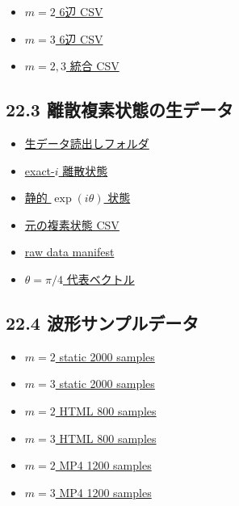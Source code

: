 \documentclass[
  a4paper,
]{ltjsarticle}
\providecommand{\tightlist}{%
  \setlength{\itemsep}{0pt}\setlength{\parskip}{0pt}}
\begin{document}
\begin{itemize}
\tightlist
\item
  \href{edges_m2.csv}{\(m=2\) 6辺 CSV}
\item
  \href{edges_m3.csv}{\(m=3\) 6辺 CSV}
\item
  \href{all_edges_m2_m3.csv}{\(m=2,3\) 統合 CSV}
\end{itemize}

\subsection{22.3
離散複素状態の生データ}\label{ux96e2ux6563ux8907ux7d20ux72b6ux614bux306eux751fux30c7ux30fcux30bf}

\begin{itemize}
\tightlist
\item
  \href{再現性検証_生データ読出し_20260915/}{生データ読出しフォルダ}
\item
  \href{再現性検証_生データ読出し_20260915/raw_data/complex_states_animation_exact_i.csv}{exact-\(i\)
  離散状態}
\item
  \href{再現性検証_生データ読出し_20260915/raw_data/complex_states_static_exp.csv}{静的
  \(\exp(i\theta)\) 状態}
\item
  \href{再現性検証_生データ読出し_20260915/raw_data/complex_states.csv}{元の複素状態
  CSV}
\item
  \href{再現性検証_生データ読出し_20260915/raw_data/RAW_DATA_MANIFEST.csv}{raw
  data manifest}
\item
  \href{再現性検証_生データ読出し_20260915/raw_data/representative_vectors_theta_pi4.csv}{\(\theta=\pi/4\)
  代表ベクトル}
\end{itemize}

\subsection{22.4
波形サンプルデータ}\label{ux6ce2ux5f62ux30b5ux30f3ux30d7ux30ebux30c7ux30fcux30bf}

\begin{itemize}
\tightlist
\item
  \href{再現性検証_生データ読出し_20260915/raw_data/wave_samples_static_2000_m2.csv}{\(m=2\)
  static 2000 samples}
\item
  \href{再現性検証_生データ読出し_20260915/raw_data/wave_samples_static_2000_m3.csv}{\(m=3\)
  static 2000 samples}
\item
  \href{再現性検証_生データ読出し_20260915/raw_data/wave_samples_html_800_m2.csv}{\(m=2\)
  HTML 800 samples}
\item
  \href{再現性検証_生データ読出し_20260915/raw_data/wave_samples_html_800_m3.csv}{\(m=3\)
  HTML 800 samples}
\item
  \href{再現性検証_生データ読出し_20260915/raw_data/wave_samples_mp4_1200_m2.csv}{\(m=2\)
  MP4 1200 samples}
\item
  \href{再現性検証_生データ読出し_20260915/raw_data/wave_samples_mp4_1200_m3.csv}{\(m=3\)
  MP4 1200 samples}
\end{itemize}
\end{document}
